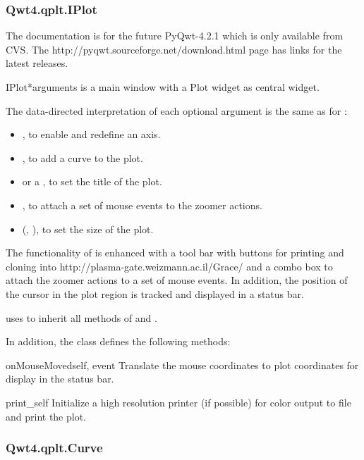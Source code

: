 \documentclass{manual}
\newcommand{\Grace}{\ulink{Grace}
  {http://plasma-gate.weizmann.ac.il/Grace/}}
\newcommand{\Download}{\ulink{download}
  {http://pyqwt.sourceforge.net/download.html}}
\newcommand{\Future}{
  \begin{notice}[warning]
    The documentation is for the future PyQwt-4.2.1 which is only available
    from CVS. The \Download{} page has links for the latest releases.
  \end{notice}
}
\begin{document}
\subsubsection{Qwt4.qplt.IPlot \label{intro-qplt-iplot}}

\Future{}

\begin{classdesc}{IPlot}{*arguments}
   is a main window with a Plot widget as central widget.

  The data-directed interpretation of each optional argument is the
  same as for :
  \begin{itemize}
  \item
    , to enable and redefine an axis.
  \item
    , to add a curve to the plot.
  \item
     or a , to set the title of the plot.
  \item
    , to attach a set of mouse events to the zoomer actions.
  \item
    (, ), to set the size of the plot.
  \end{itemize}

  The functionality of  is enhanced with a tool bar with
  buttons for printing and cloning into \Grace{} and a combo box to attach
  the zoomer actions to a set of mouse events.
  In addition, the position of the cursor in the plot region is tracked
  and displayed in a status bar. 

   uses  to inherit all methods of
   and .


In addition, the class  defines the following methods:

\begin{methoddesc}[Plot]{onMouseMoved}{self, event}
Translate the mouse coordinates to plot coordinates for display in the status
bar.
\end{methoddesc}

\begin{methoddesc}[IPlot]{print_}{self}
Initialize a high resolution printer (if possible) for color output to file and
print the plot.
\end{methoddesc}

\end{classdesc}

\subsubsection{Qwt4.qplt.Curve \label{intro-qplt-curve}}
\end{document}
